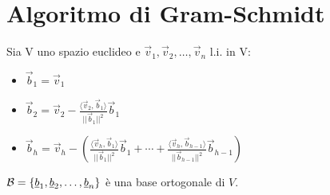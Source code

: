 \section{Algoritmo di Gram-Schmidt}

Sia V uno spazio euclideo e $\vec{v}_1, \vec{v}_2, \dots, \vec{v}_n$ l.i. in V:
\begin{itemize}
	\item $\vec{b}_1 = \vec{v}_1$
	\item $\vec{b}_2 = \vec{v}_2 - \frac{\langle\vec{v}_2,\vec{b}_1\rangle}{||\vec{b}_1||^2}\vec{b}_1$
	\item $\vec{b}_h = \vec{v}_h - \left(
		\frac{\langle\vec{v}_h,\vec{b}_1\rangle}{||\vec{b}_1||^2}\vec{b}_1 +
		\cdots +
		\frac{\langle\vec{v}_h,\vec{b}_{h-1}\rangle}{||\vec{b}_{h-1}||^2}\vec{b}_{h-1}
	\right)$
\end{itemize}

$\mathcal{B} = \{\underline{b}_1, \underline{b}_2, \dots, \underline{b}_n\}$ è una base ortogonale di $V$.
